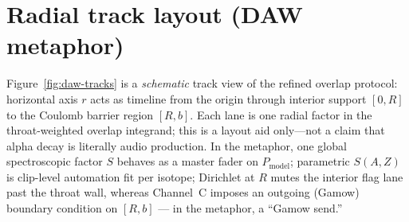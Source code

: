 \documentclass[11pt,a4paper]{article}
\theoremstyle{remark}
\begin{document}
\section{Radial track layout (DAW metaphor)}
\label{sec:daw-tracks}

Figure~\ref{fig:daw-tracks} is a \emph{schematic} track view of the
refined overlap protocol: horizontal axis $r$ acts as timeline from the
origin through interior support $[0,R]$ to the Coulomb barrier region
$[R,b]$.  Each lane is one radial factor in the throat-weighted overlap
integrand; this is a layout aid only---not a claim that alpha decay is
literally audio production.  In the metaphor, one global spectroscopic
factor $S$ behaves as a master fader on $P_{\mathrm{model}}$; parametric
$S(A,Z)$ is clip-level automation fit per isotope; Dirichlet at $R$
mutes the interior flag lane past the throat wall, whereas Channel~C
imposes an outgoing (Gamow) boundary condition on $[R,b]$ --- in the
metaphor, a ``Gamow send.''
\end{document}
